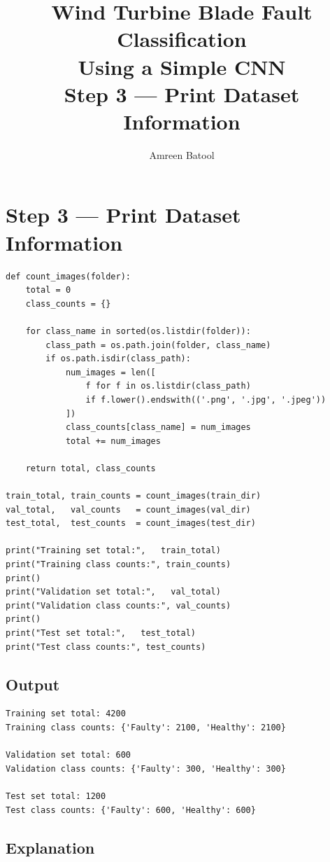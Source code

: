 \documentclass[12pt]{article}
\title{\textbf{Wind Turbine Blade Fault Classification\\Using a Simple CNN}\\[0.5em]
\large Step 3 --- Print Dataset Information}
\author{Amreen Batool}
\date{}
\begin{document}
\maketitle

\section*{Step 3 --- Print Dataset Information}

\begin{lstlisting}[style=pythonstyle]
def count_images(folder):
    total = 0
    class_counts = {}

    for class_name in sorted(os.listdir(folder)):
        class_path = os.path.join(folder, class_name)
        if os.path.isdir(class_path):
            num_images = len([
                f for f in os.listdir(class_path)
                if f.lower().endswith(('.png', '.jpg', '.jpeg'))
            ])
            class_counts[class_name] = num_images
            total += num_images

    return total, class_counts

train_total, train_counts = count_images(train_dir)
val_total,   val_counts   = count_images(val_dir)
test_total,  test_counts  = count_images(test_dir)

print("Training set total:",   train_total)
print("Training class counts:", train_counts)
print()
print("Validation set total:",   val_total)
print("Validation class counts:", val_counts)
print()
print("Test set total:",   test_total)
print("Test class counts:", test_counts)
\end{lstlisting}

\subsection*{Output}

\begin{lstlisting}[style=outputstyle]
Training set total: 4200
Training class counts: {'Faulty': 2100, 'Healthy': 2100}

Validation set total: 600
Validation class counts: {'Faulty': 300, 'Healthy': 300}

Test set total: 1200
Test class counts: {'Faulty': 600, 'Healthy': 600}
\end{lstlisting}

\subsection*{Explanation}
\end{document}
